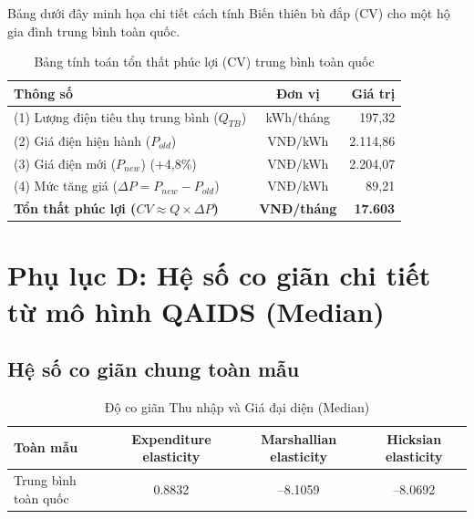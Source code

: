 \documentclass[12pt,a4paper,oneside]{article}
\begin{document}
Bảng dưới đây minh họa chi tiết cách tính Biến thiên bù đắp (CV) cho một hộ gia đình trung bình toàn quốc.

\begin{table}[H]
	\centering
	\caption{Bảng tính toán tổn thất phúc lợi (CV) trung bình toàn quốc}
	\begin{tabular}{l c r}
		\toprule
		\textbf{Thông số} & \textbf{Đơn vị} & \textbf{Giá trị} \\
		\midrule
		(1) Lượng điện tiêu thụ trung bình ($Q_{TB}$) & kWh/tháng & 197,32 \\
		(2) Giá điện hiện hành ($P_{old}$) & VNĐ/kWh & 2.114,86 \\
		(3) Giá điện mới ($P_{new}$) (+4,8\%) & VNĐ/kWh & 2.204,07 \\
		(4) Mức tăng giá ($\Delta P = P_{new} - P_{old}$) & VNĐ/kWh & 89,21 \\
		\midrule
		\textbf{Tổn thất phúc lợi ($CV \approx Q \times \Delta P$)} & \textbf{VNĐ/tháng} & \textbf{17.603} \\
		\bottomrule
	\end{tabular}
\end{table}

\section{Phụ lục D: Hệ số co giãn chi tiết từ mô hình QAIDS (Median)}

\subsection{Hệ số co giãn chung toàn mẫu}
\begin{table}[H]
	\centering
	\caption{Độ co giãn Thu nhập và Giá đại diện (Median)}
	\begin{tabular}{l c c c}
		\toprule
		\textbf{Toàn mẫu} & \textbf{Expenditure elasticity} & \textbf{Marshallian elasticity} & \textbf{Hicksian elasticity} \\
		\midrule
		Trung bình toàn quốc & 0.8832 & –8.1059 & –8.0692 \\
		\bottomrule
	\end{tabular}
\end{table}
\end{document}
